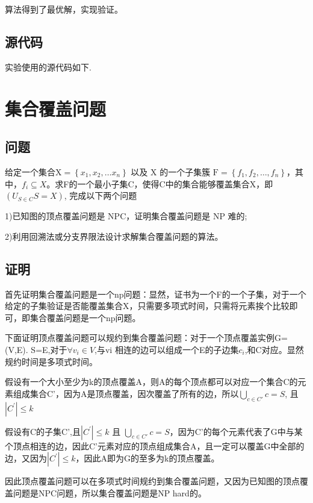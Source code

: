 \documentclass[UTF8]{ctexart}
\begin{document}
算法得到了最优解，实现验证。

\subsection{源代码}
实验使用的源代码如下.  \vspace{5mm}
	
	\vspace{3mm}




\newpage
\section{集合覆盖问题}
\subsection{问题}
给定一个集合$\mathrm{X}=\left\{x_{1}, x_{2}, \ldots x_{n}\right\}$ 以及 X 的一个子集簇 $\mathrm{F}=\left\{f_{1}, f_{2}, \ldots, f_{n}\right\}$，其中，$f_{i} \subseteq X$。求F的一个最小子集C，使得C中的集合能够覆盖集合X，即$(U_{S \in C} S=X)$, 完成以下两个问题

1)已知图的顶点覆盖问题是 NPC，证明集合覆盖问题是 NP 难的;

2)利用回溯法或分支界限法设计求解集合覆盖问题的算法。

\subsection{证明}
首先证明集合覆盖问题是一个np问题：显然，证书为一个F的一个子集，对于一个给定的子集验证是否能覆盖集合X，只需要多项式时间，只需将元素挨个比较即可，即集合覆盖问题是一个np问题。

下面证明顶点覆盖问题可以规约到集合覆盖问题：对于一个顶点覆盖实例G=(V,E). S=E,对于$\forall v_{i} \in V$,与vi 相连的边可以组成一个E的子边集$c_{i}$,和C对应。显然规约时间是多项式时间。

假设有一个大小至少为k的顶点覆盖A，则A的每个顶点都可以对应一个集合C的元素组成集合C'，因为A是顶点覆盖，因次覆盖了所有的边，所以$\bigcup_{c \in C'} c=S$, 且$\left|C^{\prime}\right| \leq k$

假设有C的子集C',且$\left|C^{\prime}\right| \leq k$ 且 $\bigcup_{c \in C'} c=S$，因为C’的每个元素代表了G中与某个顶点相连的边，因此C'元素对应的顶点组成集合A，且一定可以覆盖G中全部的边，又因为$\left|C^{\prime}\right| \leq k$，因此A即为G的至多为k的顶点覆盖。

因此顶点覆盖问题可以在多项式时间规约到集合覆盖问题，又因为已知图的顶点覆盖问题是NPC问题，所以集合覆盖问题是NP hard的。
\end{document}
